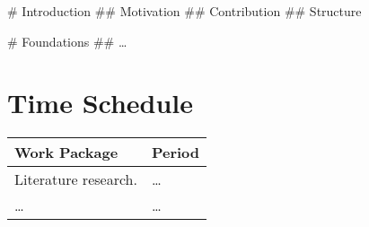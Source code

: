 \documentclass{scrartcl}
\begin{document}
\begin{easylist}[articletoc]
    # Introduction
    ## Motivation
    ## Contribution
    ## Structure

    # Foundations
    ## \dots
\end{easylist}


\section{Time Schedule}\label{sec:schedule}

\begin{longtable}{ll}
    \toprule

    \textbf{Work Package} & \textbf{Period} \\%
    \midrule%
    \endhead%

    Literature research.  & \dots           \\
    \dots                 & \dots           \\

    \bottomrule
\end{longtable}



\printbibliography
\end{document}
